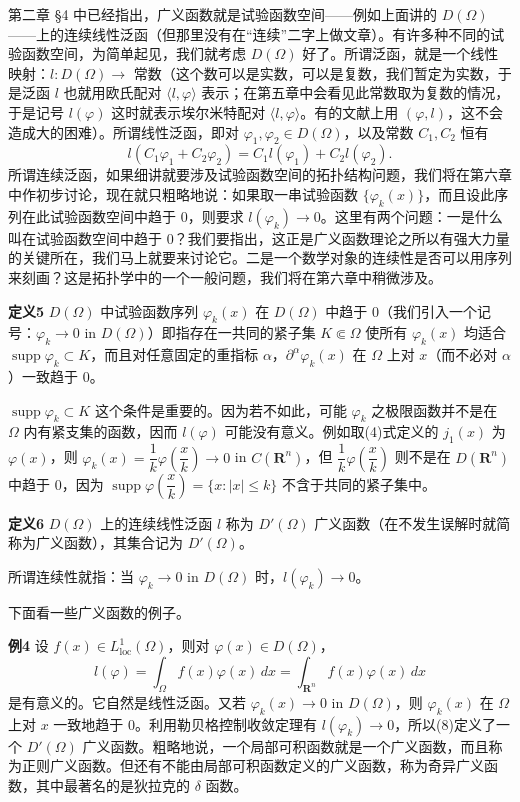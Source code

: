 第二章 §4 中已经指出，广义函数就是试验函数空间——例如上面讲的 $D(\Omega)$——上的连续线性泛函（但那里没有在“连续”二字上做文章）。有许多种不同的试验函数空间，为简单起见，我们就考虑 $D(\Omega)$ 好了。所谓泛函，就是一个线性映射：$l:D(\Omega)\to$ 常数（这个数可以是实数，可以是复数，我们暂定为实数，于是泛函 $l$ 也就用欧氏配对 $\langle l,\varphi\rangle$ 表示；在第五章中会看见此常数取为复数的情况，于是记号 $l(\varphi)$ 这时就表示埃尔米特配对 $\langle l,\varphi\rangle$。有的文献上用 $(\varphi,l)$，这不会造成大的困难）。所谓线性泛函，即对 $\varphi_1,\varphi_2\in D(\Omega)$，以及常数 $C_1,C_2$ 恒有
\[
 l(C_1\varphi_1+C_2\varphi_2)=C_1l(\varphi_1)+C_2l(\varphi_2).
\]
所谓连续泛函，如果细讲就要涉及试验函数空间的拓扑结构问题，我们将在第六章中作初步讨论，现在就只粗略地说：如果取一串试验函数 $\{\varphi_k(x)\}$，而且设此序列在此试验函数空间中趋于 0，则要求 $l(\varphi_k)\to0$。这里有两个问题：一是什么叫在试验函数空间中趋于 0？我们要指出，这正是广义函数理论之所以有强大力量的关键所在，我们马上就要来讨论它。二是一个数学对象的连续性是否可以用序列来刻画？这是拓扑学中的一个一般问题，我们将在第六章中稍微涉及。

\noindent\textbf{定义5}
$D(\Omega)$ 中试验函数序列 $\varphi_k(x)$ 在 $D(\Omega)$ 中趋于 0（我们引入一个记号：$\varphi_k\to0$ in $D(\Omega)$）即指存在一共同的紧子集 $K\Subset\Omega$ 使所有 $\varphi_k(x)$ 均适合 $\operatorname{supp}\varphi_k\subset K$，而且对任意固定的重指标 $\alpha$，$\partial^\alpha\varphi_k(x)$ 在 $\Omega$ 上对 $x$（而不必对 $\alpha$）一致趋于 0。

$\operatorname{supp}\varphi_k\subset K$ 这个条件是重要的。因为若不如此，可能 $\varphi_k$ 之极限函数并不是在 $\Omega$ 内有紧支集的函数，因而 $l(\varphi)$ 可能没有意义。例如取(4)式定义的 $j_1(x)$ 为 $\varphi(x)$，则 $\varphi_k(x)=\dfrac1k\varphi\!\left(\dfrac{x}{k}\right)\to0$ in $C(\mathbf R^n)$，但 $\dfrac1k\varphi\!\left(\dfrac{x}{k}\right)$ 则不是在 $D(\mathbf R^n)$ 中趋于 0，因为 $\operatorname{supp}\varphi\!\left(\dfrac{x}{k}\right)=\{x:|x|\le k\}$ 不含于共同的紧子集中。

\noindent\textbf{定义6}
$D(\Omega)$ 上的连续线性泛函 $l$ 称为 $D'(\Omega)$ 广义函数（在不发生误解时就简称为广义函数），其集合记为 $D'(\Omega)$。

所谓连续性就指：当 $\varphi_k\to0$ in $D(\Omega)$ 时，$l(\varphi_k)\to0$。

下面看一些广义函数的例子。

\noindent\textbf{例4}
设 $f(x)\in L^1_{\mathrm{loc}}(\Omega)$，则对 $\varphi(x)\in D(\Omega)$，
\begin{equation}
 l(\varphi)=\int_\Omega f(x)\varphi(x)\,dx
 =\int_{\mathbf R^n}f(x)\varphi(x)\,dx
 \tag{8}
\end{equation}
是有意义的。它自然是线性泛函。又若 $\varphi_k(x)\to0$ in $D(\Omega)$，则 $\varphi_k(x)$ 在 $\Omega$ 上对 $x$ 一致地趋于 0。利用勒贝格控制收敛定理有 $l(\varphi_k)\to0$，所以(8)定义了一个 $D'(\Omega)$ 广义函数。粗略地说，一个局部可积函数就是一个广义函数，而且称为正则广义函数。但还有不能由局部可积函数定义的广义函数，称为奇异广义函数，其中最著名的是狄拉克的 $\delta$ 函数。

